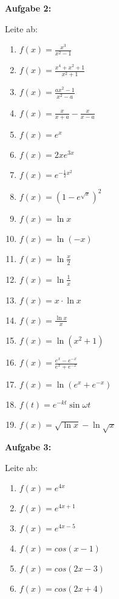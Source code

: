 \documentclass[a4paper,12pt]{article}
\newcommand{\Aufgabe}[1]{
  {
  \vspace*{0.5cm}
  \textsf{\textbf{Aufgabe #1}}
  \vspace*{0.2cm}
  
  }
}
\begin{document}
\Aufgabe{2:}
Leite ab:
\begin{enumerate}[label={\alph*)}, topsep=5pt,itemsep=4ex,partopsep=1ex,parsep=1ex]
  \item $f(x)=\frac{x^3}{x^2-1}$
  \item $f(x)=\frac{x^4+x^2+1}{x^2+1}$
  \item $f(x)=\frac{ax^2-1}{x^2-a}$
  \item $f(x)=\frac{x}{x+a}-\frac{x}{x-a}$
  \item $f(x)=e^x$
  \item $f(x)=2xe^{3x}$
  \item $f(x)=e^{-\frac{1}{2}x^2}$
  \item $f(x)=(1-e^{\sqrt{x}})^2$
  \item $f(x)=\ln{x}$
  \item $f(x)=\ln(-x)$
  \item $f(x)=\ln{\frac{x}{2}}$
  \item $f(x)=\ln{\frac{1}{x}}$
  \item $f(x)=x\cdot \ln{x}$
  \item $f(x)=\frac{\ln{x}}{x}$
  \item $f(x)=\ln(x^2+1)$
  \item $f(x)=\frac{e^x-e^{-x}}{e^x+e^{-x}}$
  \item $f(x)=\ln(e^x+e^{-x})$
  \item $f(t)=e^{-kt}\sin{\omega t}$
  \item $f(x)=\sqrt{\ln{x}}-\ln{\sqrt{x}}$
\end{enumerate}

\newpage
\Aufgabe{3:}
Leite ab:
\begin{enumerate}[label={\alph*)}, topsep=5pt,itemsep=4ex,partopsep=1ex,parsep=1ex]
  \item $f(x)=e^{4x}$
  \item $f(x)=e^{4x+1}$
  \item $f(x)=e^{4x-5}$
  \item $f(x)=cos(x-1)$
  \item $f(x)=cos(2x-3)$
  \item $f(x)=cos(2x+4)$
\end{enumerate}
\end{document}
